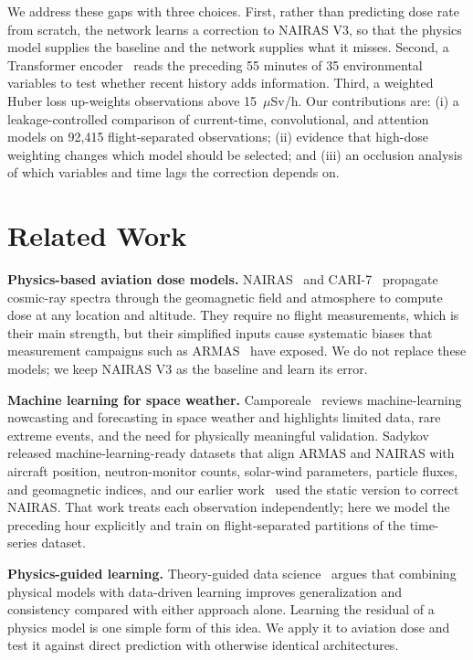 \documentclass[10pt,twocolumn,letterpaper]{article}
\begin{document}
We address these gaps with three choices. First, rather than predicting dose
rate from scratch, the network learns a correction to NAIRAS V3, so that the
physics model supplies the baseline and the network supplies what it misses.
Second, a Transformer encoder~\cite{vaswani2017} reads the preceding 55 minutes
of 35 environmental variables to test whether recent history adds information.
Third, a weighted Huber loss up-weights observations above 15~$\mu$Sv/h. Our
contributions are: (i) a leakage-controlled comparison of current-time,
convolutional, and attention models on 92,415 flight-separated observations;
(ii) evidence that high-dose weighting changes which model should be selected;
and (iii) an occlusion analysis of which variables and time lags the
correction depends on.

\section{Related Work}
\label{sec:related}

\textbf{Physics-based aviation dose models.}
NAIRAS~\cite{mertens2013} and CARI-7~\cite{copeland2017} propagate cosmic-ray
spectra through the geomagnetic field and atmosphere to compute dose at any
location and altitude. They require no flight measurements, which is their
main strength, but their simplified inputs cause systematic biases that
measurement campaigns such as ARMAS~\cite{tobiska2016} have exposed. We do not
replace these models; we keep NAIRAS V3 as the baseline and learn its error.

\textbf{Machine learning for space weather.}
Camporeale~\cite{camporeale2019} reviews machine-learning nowcasting and
forecasting in space weather and highlights limited data, rare extreme events,
and the need for physically meaningful validation. Sadykov
\etal~\cite{sadykov2026} released machine-learning-ready datasets that align
ARMAS and NAIRAS with aircraft position, neutron-monitor counts, solar-wind
parameters, particle fluxes, and geomagnetic indices, and our earlier
work~\cite{kc2025} used the static version to correct NAIRAS. That work treats
each observation independently; here we model the preceding hour explicitly
and train on flight-separated partitions of the time-series dataset.

\textbf{Physics-guided learning.}
Theory-guided data science~\cite{karpatne2017} argues that combining physical
models with data-driven learning improves generalization and consistency
compared with either approach alone. Learning the residual of a physics model
is one simple form of this idea. We apply it to aviation dose and test it
against direct prediction with otherwise identical architectures.
\end{document}

